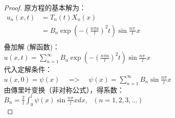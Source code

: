\begin{example}
\begin{proof}
原方程的基本解为：\\
   $\begin{array}{llll}
	u_n(x,t) &= T_n(t)X_n(x)\\
	&= B_n  \exp(-(\frac{n\pi a}{l})^2 t) \sin \frac{n\pi~}{l} x \\
\end{array}$ \\ 
 叠加解 (解函数)：\\ 
 $ \displaystyle u(x,t)=\sum_{n=1}^{\infty } B_n  \exp(-(\frac{n\pi a}{l})^2 t) \sin \frac{n\pi~}{l} x$ \\
代入定解条件：\\ 
 $ \displaystyle u(x,0)= \psi(x)$ ~~=> ~~$\psi (x)=\sum_{n=1}^{\infty } B_n \sin \frac{ n\pi }{l} x$\\  
由傳里叶变换（非对称公式），得系数：\\  
$ \displaystyle B_n=  \frac{2}{l}\int_{0 }^{l}  \psi (x) \sin \frac{ n\pi }{l} x dx , ~~~ (n=1,2,3,...) $\\   
\end{proof}
\end{example}

